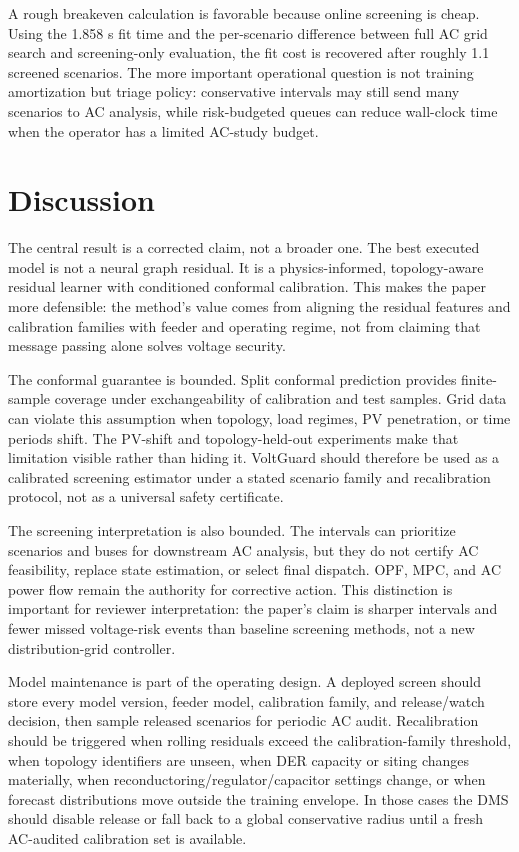 \documentclass[
  preprint,12pt]{elsarticle}
\begin{document}
A rough breakeven calculation is favorable because online screening is
cheap. Using the 1.858 s fit time and the per-scenario difference
between full AC grid search and screening-only evaluation, the fit cost
is recovered after roughly 1.1 screened scenarios. The more important
operational question is not training amortization but triage policy:
conservative intervals may still send many scenarios to AC analysis,
while risk-budgeted queues can reduce wall-clock time when the operator
has a limited AC-study budget.

\section{Discussion}\label{discussion}

The central result is a corrected claim, not a broader one. The best
executed model is not a neural graph residual. It is a physics-informed,
topology-aware residual learner with conditioned conformal calibration.
This makes the paper more defensible: the method's value comes from
aligning the residual features and calibration families with feeder and
operating regime, not from claiming that message passing alone solves
voltage security.

The conformal guarantee is bounded. Split conformal prediction provides
finite-sample coverage under exchangeability of calibration and test
samples. Grid data can violate this assumption when topology, load
regimes, PV penetration, or time periods shift. The PV-shift and
topology-held-out experiments make that limitation visible rather than
hiding it. VoltGuard should therefore be used as a calibrated screening
estimator under a stated scenario family and recalibration protocol, not
as a universal safety certificate.

The screening interpretation is also bounded. The intervals can
prioritize scenarios and buses for downstream AC analysis, but they do
not certify AC feasibility, replace state estimation, or select final
dispatch. OPF, MPC, and AC power flow remain the authority for
corrective action. This distinction is important for reviewer
interpretation: the paper's claim is sharper intervals and fewer missed
voltage-risk events than baseline screening methods, not a new
distribution-grid controller.

Model maintenance is part of the operating design. A deployed screen
should store every model version, feeder model, calibration family, and
release/watch decision, then sample released scenarios for periodic AC
audit. Recalibration should be triggered when rolling residuals exceed
the calibration-family threshold, when topology identifiers are unseen,
when DER capacity or siting changes materially, when
reconductoring/regulator/capacitor settings change, or when forecast
distributions move outside the training envelope. In those cases the DMS
should disable release or fall back to a global conservative radius
until a fresh AC-audited calibration set is available.
\end{document}

